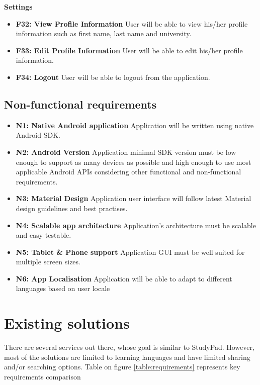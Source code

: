 \documentclass[thesis=B,english]{FITthesis}[2012/10/20]
\newcommand{\appname}{StudyPad}
\begin{document}
\bigskip
\textbf{Settings}
\begin{itemize}
	\item \textbf{F32: View Profile Information} User will be able to view his/her profile information such as first name, last name and  university.
	\item \textbf{F33: Edit Profile Information} User will be able to edit his/her profile information.
	\item \textbf{F34: Logout} User will be able to logout from the application.
\end{itemize}


\subsection{Non-functional requirements}

\begin{itemize}
  \item \textbf{N1: Native Android application}  Application will be written using native Android SDK.
  \item \textbf{N2: Android Version} Application minimal SDK version must be low enough to support as many devices as possible and high enough to use most applicable  Android APIs considering other functional and non-functional requirements.
  \item \textbf{N3: Material Design} Application user interface will follow latest Material design guidelines and best practises.
  \item \textbf{N4: Scalable app architecture} Application's architecture must be scalable and easy testable.
  \item \textbf{N5: Tablet \& Phone support} Application GUI must be well suited for multiple screen sizes.
  \item \textbf{N6: App Localisation} Application will be able to adapt to different languages based on user locale
\end{itemize}


\newpage

\section{Existing solutions}

There are several services out there, whose goal is similar to \appname. However, most of the solutions are limited to learning languages and have limited sharing and/or searching options. Table on figure \ref{table:requirements} represents key requirements comparison
\end{document}
